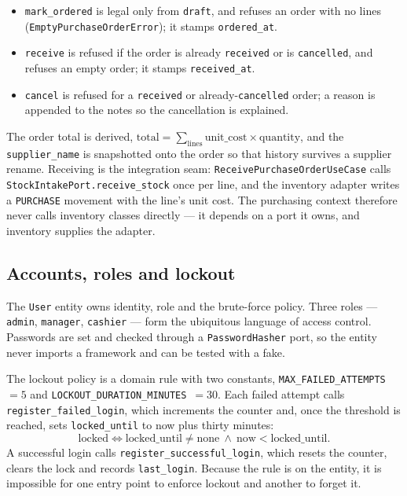 \documentclass[11pt,a4paper]{article}
\begin{document}
\begin{itemize}[leftmargin=1.4em]
  \item \texttt{mark\_ordered} is legal only from \texttt{draft}, and refuses an order with no lines
  (\texttt{EmptyPurchaseOrderError}); it stamps \texttt{ordered\_at}.
  \item \texttt{receive} is refused if the order is already \texttt{received} or is
  \texttt{cancelled}, and refuses an empty order; it stamps \texttt{received\_at}.
  \item \texttt{cancel} is refused for a \texttt{received} or already-\texttt{cancelled} order; a
  reason is appended to the notes so the cancellation is explained.
\end{itemize}

The order total is derived, $\text{total} = \sum_{\text{lines}} \text{unit\_cost} \times
\text{quantity}$, and the \texttt{supplier\_name} is snapshotted onto the order so that history
survives a supplier rename. Receiving is the integration seam: \texttt{ReceivePurchaseOrderUseCase}
calls \texttt{StockIntakePort.receive\_stock} once per line, and the inventory adapter writes a
\texttt{PURCHASE} movement with the line's unit cost. The purchasing context therefore never calls
inventory classes directly --- it depends on a port it owns, and inventory supplies the adapter.

\subsection{Accounts, roles and lockout}

The \texttt{User} entity owns identity, role and the brute-force policy. Three roles
--- \texttt{admin}, \texttt{manager}, \texttt{cashier} --- form the ubiquitous language of access
control. Passwords are set and checked through a \texttt{PasswordHasher} port, so the entity never
imports a framework and can be tested with a fake.

The lockout policy is a domain rule with two constants, \texttt{MAX\_FAILED\_ATTEMPTS}~$=5$ and
\texttt{LOCKOUT\_DURATION\_MINUTES}~$=30$. Each failed attempt calls
\texttt{register\_failed\_login}, which increments the counter and, once the threshold is reached,
sets \texttt{locked\_until} to now plus thirty minutes:
\begin{equation}
\text{locked} \iff \text{locked\_until} \neq \text{none} \ \wedge\ \text{now} < \text{locked\_until}.
\end{equation}
A successful login calls \texttt{register\_successful\_login}, which resets the counter, clears the
lock and records \texttt{last\_login}. Because the rule is on the entity, it is impossible for one
entry point to enforce lockout and another to forget it.
\end{document}
